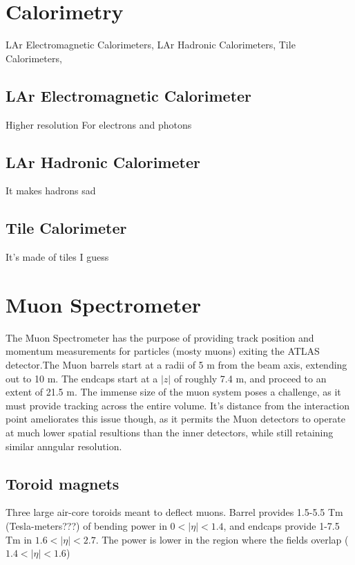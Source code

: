 \section{Calorimetry} %
    LAr Electromagnetic Calorimeters,
    LAr Hadronic Calorimeters,
    Tile Calorimeters,


    \subsection{LAr Electromagnetic Calorimeter}
        Higher resolution
        For electrons and photons


    \subsection{LAr Hadronic Calorimeter}
        It makes hadrons sad


    \subsection{Tile Calorimeter}
        It's made of tiles I guess


\section{Muon Spectrometer}  %
    The Muon Spectrometer has the purpose of providing track position and momentum measurements for particles (mosty muons) exiting the ATLAS detector.The Muon barrels start at a radii of 5 m from the beam axis, extending out to 10 m. The endcaps start at a $|z|$ of roughly 7.4 m, and proceed to an extent of 21.5 m. The immense size of the muon system poses a challenge, as it must provide tracking across the entire volume. It's distance from the interaction point ameliorates this issue though, as it permits the Muon detectors to operate at much lower spatial resultions than the inner detectors, while still retaining similar anngular resolution.

    \subsection{Toroid magnets}
        Three large air-core toroids meant to deflect muons.
        Barrel provides 1.5-5.5 Tm (Tesla-meters???) of bending power in $0<|\eta|<1.4$,
        and endcaps provide 1-7.5 Tm in $1.6<|\eta|<2.7$.
        The power is lower in the region where the fields overlap ($1.4<|\eta|<1.6$)

